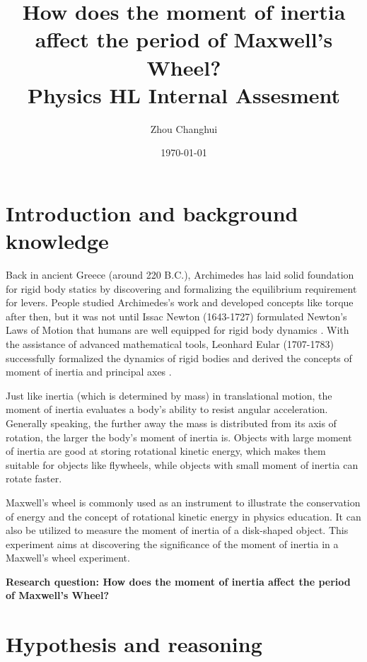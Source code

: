 \documentclass[a4paper]{article}
\begin{document}
\begin{titlepage}
    \title{\textbf{How does the moment of inertia affect the period of Maxwell's Wheel? \\ \small Physics HL Internal Assesment}}
    \author{Zhou Changhui}
    \date{\today}
    \maketitle
\end{titlepage}

\section{Introduction and background knowledge}

Back in ancient Greece (around 220 B.C.), Archimedes has laid solid foundation for rigid body statics by discovering and formalizing the equilibrium requirement for levers. People studied Archimedes's work and developed concepts like torque after then, but it was not until Issac Newton (1643-1727) formulated Newton's Laws of Motion that humans are well equipped for rigid body dynamics \cite{farber-1961}. With the assistance of advanced mathematical tools, Leonhard Eular (1707-1783) successfully formalized the dynamics of rigid bodies and derived the concepts of moment of inertia and principal axes \cite{marquina2016leonhard}.

Just like inertia (which is determined by mass) in translational motion, the moment of inertia evaluates a body's ability to resist angular acceleration. Generally speaking, the further away the mass is distributed from its axis of rotation, the larger the body's moment of inertia is. Objects with large moment of inertia are good at storing rotational kinetic energy, which makes them suitable for objects like flywheels, while objects with small moment of inertia can rotate faster. 

Maxwell's wheel is commonly used as an instrument to illustrate the conservation of energy and the concept of rotational kinetic energy in physics education. It can also be utilized to measure the moment of inertia of a disk-shaped object. This experiment aims at discovering the significance of the moment of inertia in a Maxwell's wheel experiment.

\textbf{Research question: How does the moment of inertia affect the period of Maxwell's Wheel?}

\section{Hypothesis and reasoning}
\end{document}
